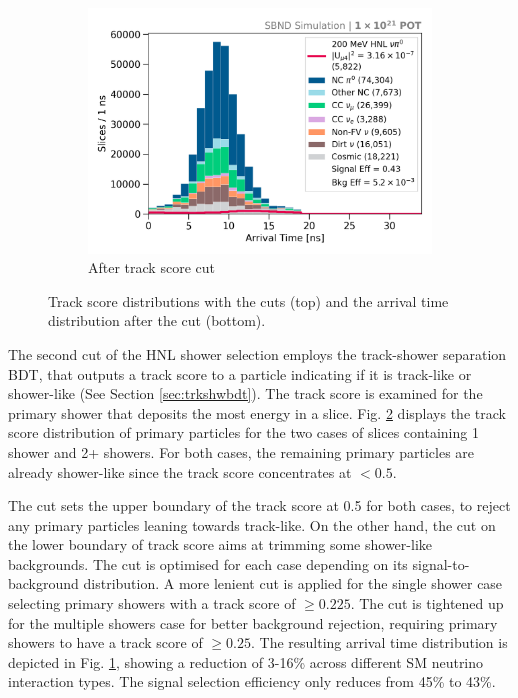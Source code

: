 \begin{figure}[b!]
\begin{subfigure}[b]{0.495\textwidth}
            \includegraphics[width=\textwidth]{beam_bucket_postrackscore}
            \caption{After track score cut}%
	    \label{fig:bb_track_score}
        \end{subfigure}
	\caption[Track Score Cut]{
		Track score distributions with the cuts (top) and the arrival time distribution after the cut (bottom). 
	}
        \label{fig:track_score_cut}
\end{figure}


The second cut of the HNL shower selection employs the track-shower separation BDT, that outputs a track score to a particle indicating if it is track-like or shower-like (See Section \ref{sec:trkshwbdt}).
The track score is  examined for the primary shower that deposits the most energy in a slice.  
Fig. \ref{fig:track_score_cut} displays the track score distribution of primary particles for the two cases of slices containing 1 shower and 2+ showers.
For both cases, the remaining primary particles are already shower-like since the track score concentrates at $< 0.5$.

The cut sets the upper boundary of the track score at 0.5 for both cases, to reject any primary particles leaning towards track-like.
On the other hand, the cut on the lower boundary of track score aims at trimming some shower-like backgrounds.
The cut is optimised for each case depending on its signal-to-background distribution.
A more lenient cut is applied for the single shower case selecting primary showers with a track score of $\geq 0.225$.
The cut is tightened up for the multiple showers case for better background rejection, requiring primary showers to have a track score of $\geq 0.25$.
The resulting arrival time distribution is depicted in Fig. \ref{fig:bb_track_score}, showing a reduction of 3-16\% across different SM neutrino interaction types.
The signal selection efficiency only reduces from 45\% to 43\%.

